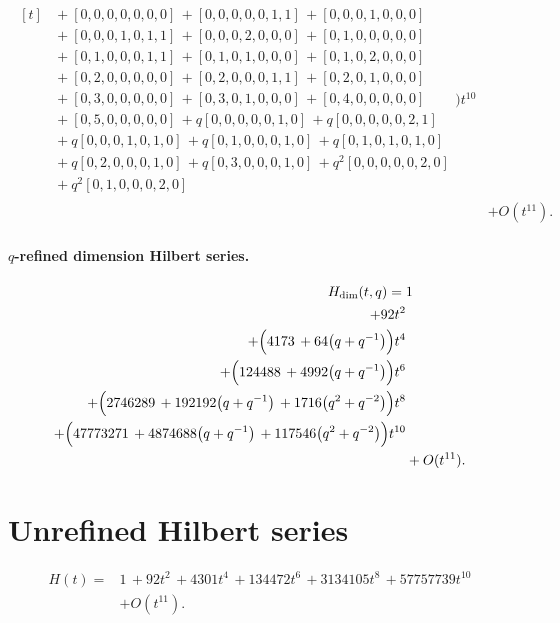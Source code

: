 \documentclass[10pt]{article}
\begin{document}
\[\begin{aligned}
\begin{aligned}[t]
  &{}+[0,0,0,0,0,0,0]\,+[0,0,0,0,0,1,1]\,+[0,0,0,1,0,0,0] \\
  &{}+[0,0,0,1,0,1,1]\,+[0,0,0,2,0,0,0]\,+[0,1,0,0,0,0,0] \\
  &{}+[0,1,0,0,0,1,1]\,+[0,1,0,1,0,0,0]\,+[0,1,0,2,0,0,0] \\
  &{}+[0,2,0,0,0,0,0]\,+[0,2,0,0,0,1,1]\,+[0,2,0,1,0,0,0] \\
  &{}+[0,3,0,0,0,0,0]\,+[0,3,0,1,0,0,0]\,+[0,4,0,0,0,0,0] \\
  &{}+[0,5,0,0,0,0,0]\,+q[0,0,0,0,0,1,0]\,+q[0,0,0,0,0,2,1] \\
  &{}+q[0,0,0,1,0,1,0]\,+q[0,1,0,0,0,1,0]\,+q[0,1,0,1,0,1,0] \\
  &{}+q[0,2,0,0,0,1,0]\,+q[0,3,0,0,0,1,0]\,+q^{2}[0,0,0,0,0,2,0] \\
  &{}+q^{2}[0,1,0,0,0,2,0]\end{aligned}\Bigr)t^{10} \\
  &+ O(t^{11}).
\end{aligned}
\]
\paragraph{$q$-refined dimension Hilbert series.}
\[
\begin{aligned}
H_{\mathrm{dim}}(t,q) ={}&
   1 \\
  + 92t^{2} \\
  + \Bigl(4173\,+64\bigl(q+q^{-1}\bigr)\Bigr)t^{4} \\
  + \Bigl(124488\,+4992\bigl(q+q^{-1}\bigr)\Bigr)t^{6} \\
  + \Bigl(2746289\,+192192\bigl(q+q^{-1}\bigr)\,+1716\bigl(q^{2}+q^{-2}\bigr)\Bigr)t^{8} \\
  + \Bigl(47773271\,+4874688\bigl(q+q^{-1}\bigr)\,+117546\bigl(q^{2}+q^{-2}\bigr)\Bigr)t^{10} \\
  &+ O(t^{11}).
\end{aligned}
\]

\section{Unrefined Hilbert series}
\[
\begin{aligned}
H(t) ={}& 1\,+92t^{2}\,+4301t^{4}\,+134472t^{6}\,+3134105t^{8}\,+57757739t^{10} \\
  &+ O(t^{11}).
\end{aligned}
\]
\end{document}
